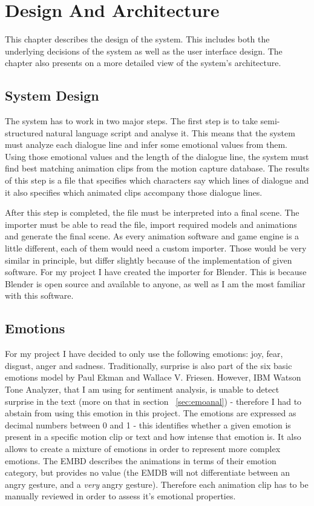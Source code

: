 \chapter{Design And Architecture\label{chap:design}}

This chapter describes the design of the system. This includes both the underlying decisions of the system as well as the user interface design. The chapter also presents on a more detailed view of the system's architecture.

\section{System Design}

The system has to work in two major steps. The first step is to take semi-structured natural language script and analyse it. This means that the system must analyze each dialogue line and infer some emotional values from them. Using those emotional values and the length of the dialogue line, the system must find best matching animation clips from the motion capture database. The results of this step is a file that specifies which characters say which lines of dialogue and it also specifies which animated clips accompany those dialogue lines.

After this step is completed, the file must be interpreted into a final scene. The importer must be able to read the file, import required models and animations and generate the final scene. As every animation software and game engine is a little different, each of them would need a custom importer. Those would be very similar in principle, but differ slightly because of the implementation of given software. For my project I have created the importer for Blender. This is because Blender is open source and available to anyone, as well as I am the most familiar with this software.


\section{Emotions}

For my project I have decided to only use the following emotions: joy, fear, disgust, anger and sadness. Traditionally, surprise is also part of the six basic emotions model by Paul Ekman and Wallace V. Friesen. However, IBM Watson Tone Analyzer, that I am using for sentiment analysis, is unable to detect surprise in the text (more on that in section ~\ref{sec:emoanal}) - therefore I had to abstain from using this emotion in this project. The emotions are expressed as decimal numbers between 0 and 1 - this identifies whether a given emotion is present in a specific motion clip or text and how intense that emotion is. It also allows to create a mixture of emotions in order to represent more complex emotions. The EMBD describes the animations in terms of their emotion category, but provides no value (the EMDB will not differentiate between an angry gesture, and a \textit{very} angry gesture). Therefore each animation clip has to be manually reviewed in order to assess it's emotional properties.

